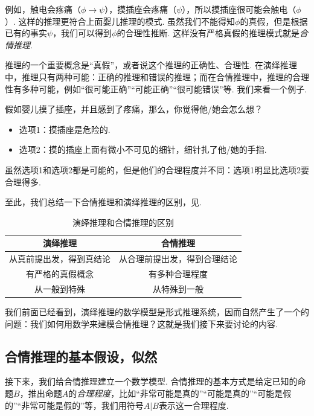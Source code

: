 例如，触电会疼痛（$\phi\to \psi$），摸插座会疼痛（$\psi$），所以摸插座很可能会触电（$\phi$）.  这样的推理更符合上面婴儿推理的模式. 虽然我们不能得知$\phi$的真假，但是根据已有的事实$\psi$，我们可以得到$\phi$的合理性推断. 这样没有严格真假的推理模式就是\textit{合情推理}.

推理的一个重要概念是“真假”，或者说这个推理的正确性、合理性. 在演绎推理中，推理只有两种可能：正确的推理和错误的推理；而在合情推理中，推理的合理性有多种可能，例如“很可能正确”“可能正确”“很可能错误”等. 我们来看一个例子. 

\begin{example}
    假如婴儿摸了插座，并且感到了疼痛，那么，你觉得他/她会怎么想？
    \begin{itemize}
        \item 选项1：摸插座是危险的. 
        \item 选项2：摸的插座上面有微小不可见的细针，细针扎了他/她的手指. 
    \end{itemize}
\end{example}
虽然选项1和选项2都是可能的，但是他们的合理程度并不同：选项1明显比选项2要合理得多. 

至此，我们总结一下合情推理和演绎推理的区别，见.

\begin{table}[htbp]
    \centering
    \caption{演绎推理和合情推理的区别}
    \label{tab:deductive-vs-plausible}
    \begin{tabular}{c|c}
        \toprule
        演绎推理 & 合情推理 \\\midrule
        从真前提出发，得到真结论 & 从合理前提出发，得到合理结论 \\
        有严格的真假概念 & 有多种合理程度 \\
        从一般到特殊 & 从特殊到一般 \\
        \bottomrule
    \end{tabular}
\end{table}

我们前面已经看到，演绎推理的数学模型是形式推理系统，因而自然产生了一个的问题：我们如何用数学来建模合情推理？这就是我们接下来要讨论的内容.

\subsection{合情推理的基本假设，似然}

接下来，我们给合情推理建立一个数学模型. 合情推理的基本方式是给定已知的命题$B$，推出命题$A$的\textit{合理程度}，比如“非常可能是真的”“可能是真的”“可能是假的”“非常可能是假的”等，我们用符号$A|B$表示这一合理程度. 

